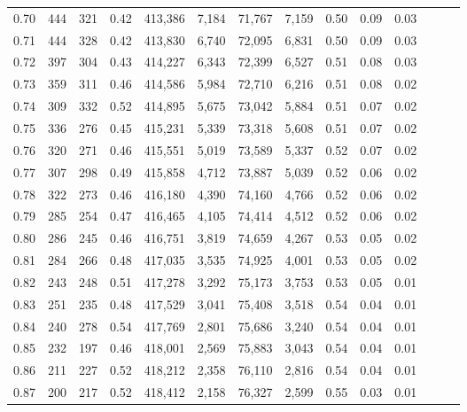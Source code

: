 \begin{tabular}{rrrrrrrrrrrrrr}
0.70 &     444 &    321 &  0.42 &  413,386 &    7,184 &  71,767 &   7,159 &  0.50 &  0.09 &      0.03 \\
0.71 &     444 &    328 &  0.42 &  413,830 &    6,740 &  72,095 &   6,831 &  0.50 &  0.09 &      0.03 \\
0.72 &     397 &    304 &  0.43 &  414,227 &    6,343 &  72,399 &   6,527 &  0.51 &  0.08 &      0.03 \\
0.73 &     359 &    311 &  0.46 &  414,586 &    5,984 &  72,710 &   6,216 &  0.51 &  0.08 &      0.02 \\
0.74 &     309 &    332 &  0.52 &  414,895 &    5,675 &  73,042 &   5,884 &  0.51 &  0.07 &      0.02 \\
0.75 &     336 &    276 &  0.45 &  415,231 &    5,339 &  73,318 &   5,608 &  0.51 &  0.07 &      0.02 \\
0.76 &     320 &    271 &  0.46 &  415,551 &    5,019 &  73,589 &   5,337 &  0.52 &  0.07 &      0.02 \\
0.77 &     307 &    298 &  0.49 &  415,858 &    4,712 &  73,887 &   5,039 &  0.52 &  0.06 &      0.02 \\
0.78 &     322 &    273 &  0.46 &  416,180 &    4,390 &  74,160 &   4,766 &  0.52 &  0.06 &      0.02 \\
0.79 &     285 &    254 &  0.47 &  416,465 &    4,105 &  74,414 &   4,512 &  0.52 &  0.06 &      0.02 \\
0.80 &     286 &    245 &  0.46 &  416,751 &    3,819 &  74,659 &   4,267 &  0.53 &  0.05 &      0.02 \\
0.81 &     284 &    266 &  0.48 &  417,035 &    3,535 &  74,925 &   4,001 &  0.53 &  0.05 &      0.02 \\
0.82 &     243 &    248 &  0.51 &  417,278 &    3,292 &  75,173 &   3,753 &  0.53 &  0.05 &      0.01 \\
0.83 &     251 &    235 &  0.48 &  417,529 &    3,041 &  75,408 &   3,518 &  0.54 &  0.04 &      0.01 \\
0.84 &     240 &    278 &  0.54 &  417,769 &    2,801 &  75,686 &   3,240 &  0.54 &  0.04 &      0.01 \\
0.85 &     232 &    197 &  0.46 &  418,001 &    2,569 &  75,883 &   3,043 &  0.54 &  0.04 &      0.01 \\
0.86 &     211 &    227 &  0.52 &  418,212 &    2,358 &  76,110 &   2,816 &  0.54 &  0.04 &      0.01 \\
0.87 &     200 &    217 &  0.52 &  418,412 &    2,158 &  76,327 &   2,599 &  0.55 &  0.03 &      0.01 \\

\end{tabular}
